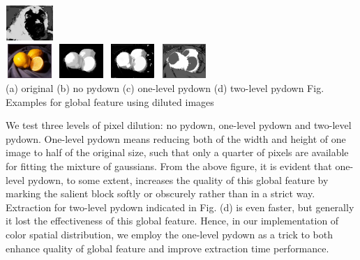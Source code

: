 \documentclass[10pt,twocolumn,letterpaper]{article}
\begin{document}
\begin{center}
    \includegraphics[width=0.72in,height=0.52in]{./Figures/pydownCompare/2DOUBLEPYDOWN.jpg} \\
    \includegraphics[width=0.72in,height=0.52in]{./Figures/pydownCompare/3.jpg}
    \includegraphics[width=0.72in,height=0.52in]{./Figures/pydownCompare/3NOPYDOWN.jpg}
    \includegraphics[width=0.72in,height=0.52in]{./Figures/pydownCompare/3PYDOWN.jpg} 
    \includegraphics[width=0.72in,height=0.52in]{./Figures/pydownCompare/3DOUBLEPYDOWN.jpg} \\
    \footnotesize (a) original (b) no pydown (c) one-level pydown (d) two-level pydown
    Fig. Examples for global feature using diluted images \\
    \end{center}

    We test three levels of pixel dilution: no pydown, one-level pydown and two-level pydown. One-level
    pydown means reducing both of the width and height of one image to half of the original size, 
    such that only a quarter of pixels are available for fitting the mixture of gaussians.
    From the above figure, it is evident that one-level pydown, to some extent, increases the quality of 
    this global feature by marking the salient block softly or obscurely rather than in a strict way. 
    Extraction for two-level pydown 
    indicated in Fig. (d) is even faster, but generally it lost the effectiveness of this global feature.
    Hence, in our implementation of color spatial distribution, we employ the one-level pydown as a trick
    to both enhance quality of global feature and improve extraction time performance.
\end{document}
